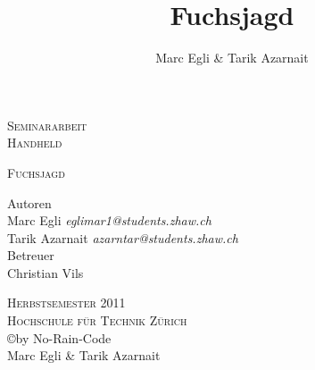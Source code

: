 
\begin{titlepage}
\author{Marc Egli \& Tarik Azarnait} 
\title{Fuchsjagd} 
\date{} 
\begin{center}

\Large
\textsc{Seminararbeit}\\
\textsc{Handheld}\\



\vspace{0.5cm}
\begin{center}
\end{center}
\textsc{Fuchsjagd} 
\vspace{1cm}

\large
Autoren\\
Marc Egli \textsl{eglimar1@students.zhaw.ch}\\
Tarik Azarnait \textsl{azarntar@students.zhaw.ch}\\

\vspace{1cm}
Betreuer\\
Christian Vils\\
\vspace{1.0cm}




\textsc{Herbstsemester 2011}\\
\textsc{Hochschule für Technik Zürich}\\
\vspace{0.5cm}
\normalsize
\copyright  by No-Rain-Code\\
Marc Egli \& Tarik Azarnait

\end{center}

\end{titlepage}
\newpage
